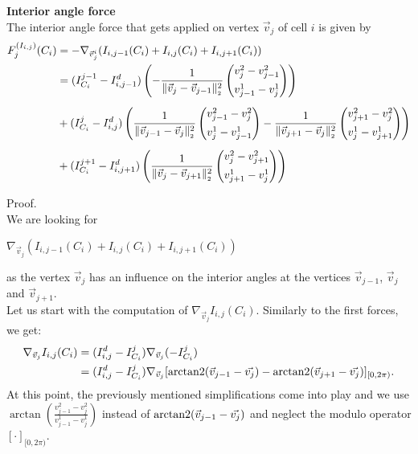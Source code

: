 \begin{proposition} \textbf{Interior angle force} \\

	The interior angle force that gets applied on vertex $\vec{v}_j$ of cell $i$ is given by 
	\begin{align}
		F^{(I_{i,j})}_j(C_i) &= - \nabla_{\vec{v}_j^i} (I_{i, j-1}(C_i) + I_{i, j}(C_i) + I_{i, j+1}(C_i) ) \\
		&= (I^{j-1}_{C_i} - I_{i, j-1}^d) \left( - \frac{1}{\norm[\vec{v}_{j} - \vec{v}_{j-1}]^2} \begin{pmatrix}
		  v_{j}^2 - v_{j-1}^2 \\[0.5em]
		  v_{j-1}^1 - v_{j}^1
	  \end{pmatrix} 
	  \right) \notag \\[0.5em] 
	  & + (I^{j}_{C_i} - I_{i, j}^d) \left( 
		\frac{1}{\norm[\vec{v}_{j-1} - \vec{v}_j]^2} \begin{pmatrix}
		  v_{j-1}^2 - v_{j}^2 \\[0.5em]
		  v_{j}^1 - v_{j-1}^1
	  \end{pmatrix} 
	  - \frac{1}{\norm[\vec{v}_{j+1} - \vec{v}_j]^2} \begin{pmatrix}
		  v_{j+1}^2 - v_{j}^2 \\[0.5em]
		  v_{j}^1 - v_{j+1}^1
	  \end{pmatrix} 
	  \right) \notag \\[0.5em] 
	  & + (I^{j+1}_{C_i} - I_{i, j+1}^d) \left( \frac{1}{\norm[\vec{v}_{j} - \vec{v}_{j+1}]^2} \begin{pmatrix}
		v_{j}^2 - v_{j+1}^2 \\[0.5em]
		v_{j+1}^1 - v_{j}^1
	\end{pmatrix} 
	\right) \notag
	\end{align}


	Proof. \\
	We are looking for 
	\begin{center}
		$
		\nabla_{\vec{v}_j} ( I_{i, j-1}(C_i) + I_{i, j}(C_i) + I_{i, j+1}(C_i) )
		$
	\end{center}
	as the vertex $\vec{v}_j$ has an influence on the interior angles at the vertices $\vec{v}_{j-1}$, $\vec{v}_{j}$ and $\vec{v}_{j+1}$. \\
	Let us start with the computation of $\nabla_{\vec{v}_j} I_{i, j}(C_i)$. 
	Similarly to the first forces, we get:
	\begin{align*}
		\nabla_{\vec{v}_j}  I_{i, j}(C_i) &= (I_{i, j}^d - I^j_{C_i}) \nabla_{\vec{v}_j} (- I^j_{C_i}) \\
		&= (I_{i, j}^d - I^j_{C_i}) \nabla_{\vec{v}_j} [\operatorname{arctan2}(\vec{v}_{j-1} - \vec{v_j}) - \operatorname{arctan2}(\vec{v}_{j+1} - \vec{v_j})]_{[0,2\pi)}.
	\end{align*}
	At this point, the previously mentioned simplifications come into play and we use $\arctan(\frac{v_{j-1}^2 - v_{j}^2}{v_{j-1}^1 - v_{j}^1})$ instead of $\operatorname{arctan2}(\vec{v}_{j-1} - \vec{v_j})$ and neglect the modulo operator $[\cdot]_{[0, 2\pi)}$.


\end{proposition}
